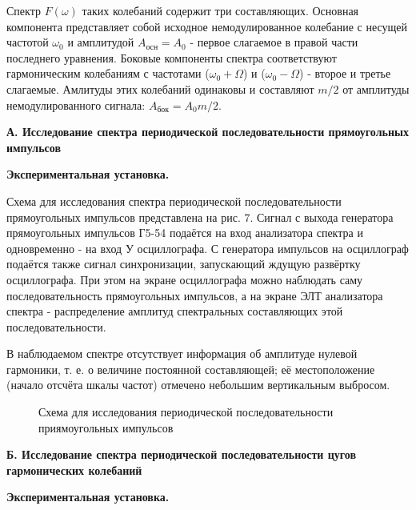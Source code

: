 \documentclass[14pt]{article}
\begin{document}
Спектр $F(\omega)$ таких колебаний содержит три составляющих. Основная компонента представляет собой исходное немодулированное колебание с несущей частотой $\omega_0$ и амплитудой $A_{\text{осн}} = A_0$ - первое слагаемое в правой части последнего уравнения. Боковые компоненты спектра соответствуют гармоническим колебаниям с частотами 
($\omega_0 + \Omega$) и ($\omega_0 - \Omega$) - второе и третье слагаемые. Амлитуды этих колебаний одинаковы и составляют $m/2$ от амплитуды немодулированного сигнала:
$A_{\text{бок}} = A_0m/2$.

\newpage
\textbf{А. Исследование спектра периодической последовательности прямоугольных импульсов}

\textbf{Экспериментальная установка.} 

Схема для исследования спектра периодической последовательности прямоугольных импульсов представлена на рис. 7. Сигнал с выхода генератора прямоугольных импульсов Г5-54 подаётся на вход анализатора спектра и одновременно - на вход У осциллографа. С генератора импульсов на осциллограф подаётся также сигнал синхронизации, запускающий ждущую развёртку осциллографа. При этом на экране осциллографа можно наблюдать саму последовательность прямоугольных импульсов, а на экране ЭЛТ анализатора спектра - распределение амплитуд спектральных составляющих этой последовательности.

В наблюдаемом спектре отсутствует информация об амплитуде нулевой гармоники, т. е. о величине постоянной составляющей; её местоположение (начало отсчёта шкалы частот) отмечено небольшим вертикальным выбросом.

\begin{figure}[h!]
	\caption{Схема для исследования периодической последовательности приямоугольных импульсов}
	\label{fig:image}
\end{figure}


\newpage
\textbf{Б. Исследование спектра периодической последовательности цугов гармонических колебаний}

\textbf{Экспериментальная установка.} 
\end{document}
